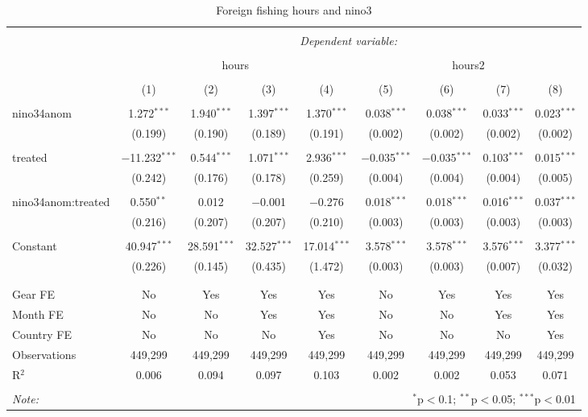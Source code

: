 
\begin{table}[!htbp] \centering 
  \caption{\label{tab:ff_reg}Foreign fishing hours and nino3} 
  \label{} 
\small 
\begin{tabular}{@{\extracolsep{5pt}}lcccccccc} 
\\[-1.8ex]\hline 
\hline \\[-1.8ex] 
 & \multicolumn{8}{c}{\textit{Dependent variable:}} \\ 
\cline{2-9} 
\\[-1.8ex] & \multicolumn{4}{c}{hours} & \multicolumn{4}{c}{hours2} \\ 
\\[-1.8ex] & (1) & (2) & (3) & (4) & (5) & (6) & (7) & (8)\\ 
\hline \\[-1.8ex] 
 nino34anom & 1.272$^{***}$ & 1.940$^{***}$ & 1.397$^{***}$ & 1.370$^{***}$ & 0.038$^{***}$ & 0.038$^{***}$ & 0.033$^{***}$ & 0.023$^{***}$ \\ 
  & (0.199) & (0.190) & (0.189) & (0.191) & (0.002) & (0.002) & (0.002) & (0.002) \\ 
  & & & & & & & & \\ 
 treated & $-$11.232$^{***}$ & 0.544$^{***}$ & 1.071$^{***}$ & 2.936$^{***}$ & $-$0.035$^{***}$ & $-$0.035$^{***}$ & 0.103$^{***}$ & 0.015$^{***}$ \\ 
  & (0.242) & (0.176) & (0.178) & (0.259) & (0.004) & (0.004) & (0.004) & (0.005) \\ 
  & & & & & & & & \\ 
 nino34anom:treated & 0.550$^{**}$ & 0.012 & $-$0.001 & $-$0.276 & 0.018$^{***}$ & 0.018$^{***}$ & 0.016$^{***}$ & 0.037$^{***}$ \\ 
  & (0.216) & (0.207) & (0.207) & (0.210) & (0.003) & (0.003) & (0.003) & (0.003) \\ 
  & & & & & & & & \\ 
 Constant & 40.947$^{***}$ & 28.591$^{***}$ & 32.527$^{***}$ & 17.014$^{***}$ & 3.578$^{***}$ & 3.578$^{***}$ & 3.576$^{***}$ & 3.377$^{***}$ \\ 
  & (0.226) & (0.145) & (0.435) & (1.472) & (0.003) & (0.003) & (0.007) & (0.032) \\ 
  & & & & & & & & \\ 
\hline \\[-1.8ex] 
Gear FE & No & Yes & Yes & Yes & No & Yes & Yes & Yes \\ 
Month FE & No & No & Yes & Yes & No & No & Yes & Yes \\ 
Country FE & No & No & No & Yes & No & No & No & Yes \\ 
Observations & 449,299 & 449,299 & 449,299 & 449,299 & 449,299 & 449,299 & 449,299 & 449,299 \\ 
R$^{2}$ & 0.006 & 0.094 & 0.097 & 0.103 & 0.002 & 0.002 & 0.053 & 0.071 \\ 
\hline 
\hline \\[-1.8ex] 
\textit{Note:}  & \multicolumn{8}{r}{$^{*}$p$<$0.1; $^{**}$p$<$0.05; $^{***}$p$<$0.01} \\ 
\end{tabular} 
\end{table} 

